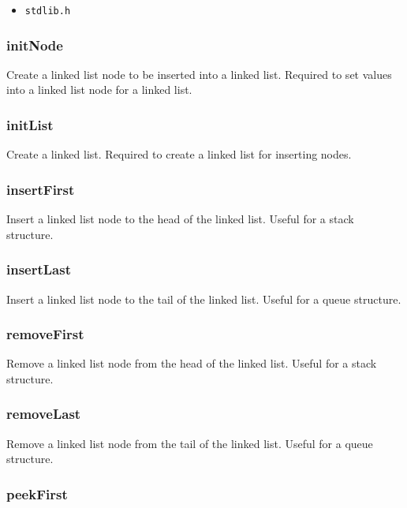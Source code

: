 \documentclass[a4paper, 12pt, titlepage]{article}
\newcommand{\code}[1]{\small\texttt{#1}\normalsize}
\begin{document}
\begin{itemize}[label={--}, noitemsep]
    \item \code{stdlib.h}
\end{itemize}

\subsubsection{initNode}

Create a linked list node to be inserted into a linked list. Required to 
set values into a linked list node for a linked list.

\subsubsection{initList}

Create a linked list. Required to create a linked list for inserting nodes.

\subsubsection{insertFirst}

Insert a linked list node to the head of the linked list. Useful for a 
stack structure.

\subsubsection{insertLast}

Insert a linked list node to the tail of the linked list. Useful for a 
queue structure.

\subsubsection{removeFirst}

Remove a linked list node from the head of the linked list. Useful for a 
stack structure.

\subsubsection{removeLast}

Remove a linked list node from the tail of the linked list. Useful for a 
queue structure.

\subsubsection{peekFirst}
\end{document}

